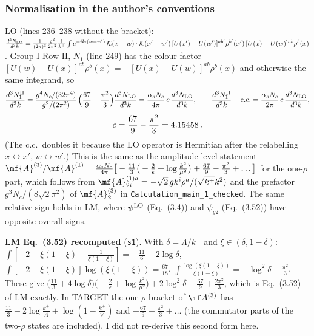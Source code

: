 \subsubsection{Normalisation in the author's conventions}
LO (lines 236--238 without the bracket): $\frac{d^{3}N_{\rm LO}}{d^{3}k}=\frac{1}{(2\pi)^{3}}\frac{g^{2}}{2\pi^{2}}\frac{1}{k^{+}}\int e^{-ik\cdot(w-w')}\,\mathcal K(x-w)\cdot\mathcal K(x'-w')\,[U(x')-U(w')]^{ab'}\rho^{b'}(x')\,[U(x)-U(w)]^{ab}\rho^{b}(x)$. Group I Row II, $N_{1}$ (line 249) has the colour factor $[U(w)-U(x)]^{ab}\rho^{b}(x)=-[U(x)-U(w)]^{ab}\rho^{b}(x)$ and otherwise the same integrand, so
\begin{align}
\frac{d^{3}N^{\rm II}_{1}}{d^{3}k}=\frac{g^{4}N_{c}/(32\pi^{4})}{g^{2}/(2\pi^{2})}\,\Big(\frac{67}{9}-\frac{\pi^{2}}{3}\Big)\frac{d^{3}N_{\rm LO}}{d^{3}k}
=\frac{\alpha_{s}N_{c}}{4\pi}\,c\,\frac{d^{3}N_{\rm LO}}{d^{3}k},\qquad
\frac{d^{3}N^{\rm II}_{1}}{d^{3}k}+{\rm c.c.}=\frac{\alpha_{s}N_{c}}{2\pi}\,c\,\frac{d^{3}N_{\rm LO}}{d^{3}k},\notag
\end{align}
\begin{align}
c=\frac{67}{9}-\frac{\pi^{2}}{3}=4.15458\,.\notag
\end{align}
(The c.c.\ doubles it because the LO operator is Hermitian after the relabelling $x\leftrightarrow x'$, $w\leftrightarrow w'$.) This is the same as the amplitude-level statement $\mf{A}^{(3)}/\mf{A}^{(1)}=\frac{\alpha_{s}N_{c}}{4\pi}\big[-\frac{11}{3}\big(-\frac{2}{\epsilon}+\log\frac{k^{2}}{\mu^{2}}\big)+\frac{67}{9}-\frac{\pi^{2}}{3}+\dots\big]$ for the one-$\rho$ part, which follows from $\mf{A}^{(1)a}_{2i}=-\sqrt2\,g k^{i}\rho^{a}/(\sqrt{k^{+}}k^{2})$ and the prefactor $g^{3}N_{c}/(8\sqrt2\pi^{2})$ of $\mf{A}^{(3)}_{2}$ in \texttt{Calculation\_main\_1\_checked}. The same relative sign holds in LM, where $\psi^{\rm LO}$ (Eq.~(3.4)) and $\psi_{g2}$ (Eq.~(3.52)) have opposite overall signs.

\noindent\textbf{LM Eq.~(3.52) recomputed} (\texttt{s1}). With $\delta=\Lambda/k^{+}$ and $\xi\in(\delta,1-\delta)$: $\int[-2+\xi(1-\xi)+\frac{1}{\xi(1-\xi)}]=-\frac{11}{6}-2\log\delta$, $\int[-2+\xi(1-\xi)]\log(\xi(1-\xi))=\frac{67}{18}$, $\int\frac{\log(\xi(1-\xi))}{\xi(1-\xi)}=-\log^{2}\delta-\frac{\pi^{2}}{3}$. These give $\big(\frac{11}{3}+4\log\delta\big)\big(-\frac{2}{\epsilon}+\log\frac{k^{2}}{\mu^{2}}\big)+2\log^{2}\delta-\frac{67}{9}+\frac{2\pi^{2}}{3}$, which is Eq.~(3.52) of LM exactly. In TARGET the one-$\rho$ bracket of $\mf A^{(3)}$ has $\frac{11}{3}-2\log\frac{k^{+}}{\Lambda}+\log(1-\frac{k^{+}}{\vee})$ and $-\frac{67}{9}+\frac{\pi^{2}}{3}+\dots$ (the commutator parts of the two-$\rho$ states are included). I did not re-derive this second form here.

